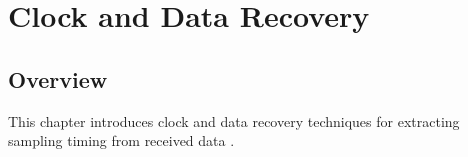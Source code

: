 \chapter{Clock and Data Recovery}

\section{Overview}

This chapter introduces clock and data recovery techniques for
extracting sampling timing from received data
\citep{palermo2025ecen720}.





